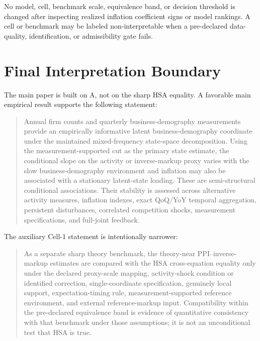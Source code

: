 \documentclass[11pt]{article}
\begin{document}
No model, cell, benchmark scale, equivalence band, or decision threshold is changed after inspecting realized inflation coefficient signs or model rankings. A cell or benchmark may be labeled non-interpretable when a pre-declared data-quality, identification, or admissibility gate fails.

\section{Final Interpretation Boundary}

The main paper is built on A, not on the sharp HSA equality. A favorable main empirical result supports the following statement:

\begin{quote}
Annual firm counts and quarterly business-demography measurements provide an empirically informative latent business-demography coordinate under the maintained mixed-frequency state-space decomposition. Using the measurement-supported cut as the primary state estimate, the conditional slope on the activity or inverse-markup proxy varies with the slow business-demography environment and inflation may also be associated with a stationary latent-state loading. These are semi-structural conditional associations. Their stability is assessed across alternative activity measures, inflation indexes, exact QoQ/YoY temporal aggregation, persistent disturbances, correlated competition shocks, measurement specifications, and full-joint feedback.
\end{quote}

The auxiliary Cell-1 statement is intentionally narrower:

\begin{quote}
As a separate sharp theory benchmark, the theory-near PPI--inverse-markup estimates are compared with the HSA cross-equation equality only under the declared proxy-scale mapping, activity-shock condition or identified correction, single-coordinate specification, genuinely local support, expectation-timing rule, measurement-supported reference environment, and external reference-markup input. Compatibility within the pre-declared equivalence band is evidence of quantitative consistency with that benchmark under those assumptions; it is not an unconditional test that HSA is true.
\end{quote}
\end{document}
